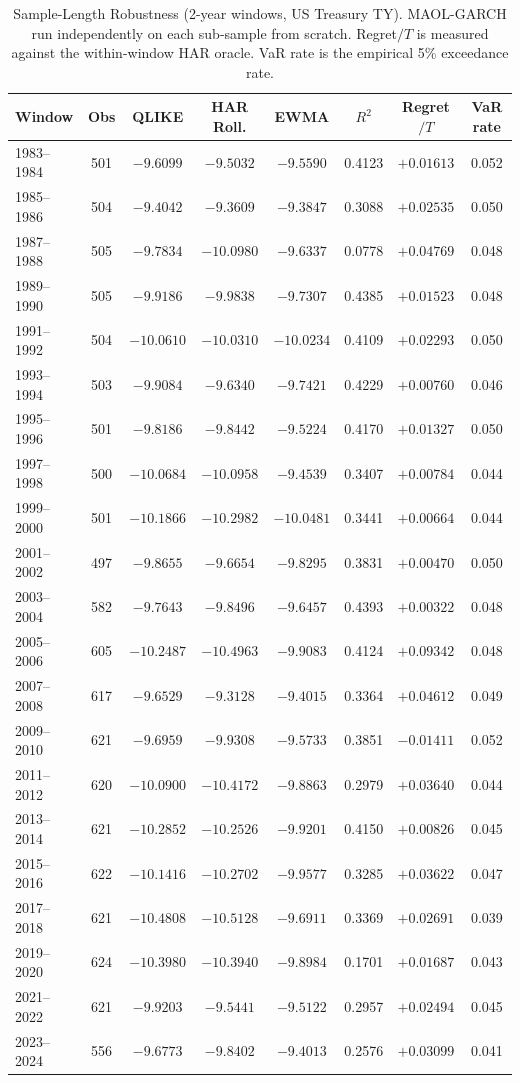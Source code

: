 \begin{table}[H]
\centering
\caption{Sample-Length Robustness (2-year windows, US Treasury TY). MAOL-GARCH run independently on each sub-sample from scratch. Regret$/T$ is measured against the within-window HAR oracle. VaR rate is the empirical 5\% exceedance rate.}
\label{tab:sl_2y}
\small
\begin{tabular}{lccccccc}
\toprule
Window & Obs & QLIKE & HAR Roll. & EWMA & $R^2$ & Regret$/T$ & VaR rate \\
\midrule
1983--1984 & 501 & $-9.6099$ & $-9.5032$ & $-9.5590$ & 0.4123 & $+0.01613$ & 0.052 \\
1985--1986 & 504 & $-9.4042$ & $-9.3609$ & $-9.3847$ & 0.3088 & $+0.02535$ & 0.050 \\
1987--1988 & 505 & $-9.7834$ & $-10.0980$ & $-9.6337$ & 0.0778 & $+0.04769$ & 0.048 \\
1989--1990 & 505 & $-9.9186$ & $-9.9838$ & $-9.7307$ & 0.4385 & $+0.01523$ & 0.048 \\
1991--1992 & 504 & $-10.0610$ & $-10.0310$ & $-10.0234$ & 0.4109 & $+0.02293$ & 0.050 \\
1993--1994 & 503 & $-9.9084$ & $-9.6340$ & $-9.7421$ & 0.4229 & $+0.00760$ & 0.046 \\
1995--1996 & 501 & $-9.8186$ & $-9.8442$ & $-9.5224$ & 0.4170 & $+0.01327$ & 0.050 \\
1997--1998 & 500 & $-10.0684$ & $-10.0958$ & $-9.4539$ & 0.3407 & $+0.00784$ & 0.044 \\
1999--2000 & 501 & $-10.1866$ & $-10.2982$ & $-10.0481$ & 0.3441 & $+0.00664$ & 0.044 \\
2001--2002 & 497 & $-9.8655$ & $-9.6654$ & $-9.8295$ & 0.3831 & $+0.00470$ & 0.050 \\
2003--2004 & 582 & $-9.7643$ & $-9.8496$ & $-9.6457$ & 0.4393 & $+0.00322$ & 0.048 \\
2005--2006 & 605 & $-10.2487$ & $-10.4963$ & $-9.9083$ & 0.4124 & $+0.09342$ & 0.048 \\
2007--2008 & 617 & $-9.6529$ & $-9.3128$ & $-9.4015$ & 0.3364 & $+0.04612$ & 0.049 \\
2009--2010 & 621 & $-9.6959$ & $-9.9308$ & $-9.5733$ & 0.3851 & $-0.01411$ & 0.052 \\
2011--2012 & 620 & $-10.0900$ & $-10.4172$ & $-9.8863$ & 0.2979 & $+0.03640$ & 0.044 \\
2013--2014 & 621 & $-10.2852$ & $-10.2526$ & $-9.9201$ & 0.4150 & $+0.00826$ & 0.045 \\
2015--2016 & 622 & $-10.1416$ & $-10.2702$ & $-9.9577$ & 0.3285 & $+0.03622$ & 0.047 \\
2017--2018 & 621 & $-10.4808$ & $-10.5128$ & $-9.6911$ & 0.3369 & $+0.02691$ & 0.039 \\
2019--2020 & 624 & $-10.3980$ & $-10.3940$ & $-9.8984$ & 0.1701 & $+0.01687$ & 0.043 \\
2021--2022 & 621 & $-9.9203$ & $-9.5441$ & $-9.5122$ & 0.2957 & $+0.02494$ & 0.045 \\
2023--2024 & 556 & $-9.6773$ & $-9.8402$ & $-9.4013$ & 0.2576 & $+0.03099$ & 0.041 \\
\bottomrule
\end{tabular}
\end{table}
